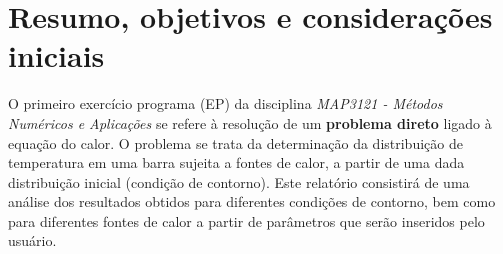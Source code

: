 \documentclass[a4paper, 12pt]{article}
\begin{document}
\thispagestyle{empty}
\newpage



\tableofcontents
\thispagestyle{empty}
\newpage



\pagestyle{fancy}

\section{Resumo, objetivos e considerações iniciais}

O primeiro exercício programa (EP) da disciplina \textit{MAP3121 - Métodos Numéricos e Aplicações} se refere à resolução de um \textbf{problema direto} ligado à equação do calor. O problema se trata da determinação da distribuição de temperatura em uma barra sujeita a fontes de calor, a partir de uma dada distribuição inicial (condição de contorno). Este relatório consistirá de uma análise dos resultados obtidos para diferentes condições de contorno, bem como para diferentes fontes de calor a partir de parâmetros que serão inseridos pelo usuário. 
\end{document}
